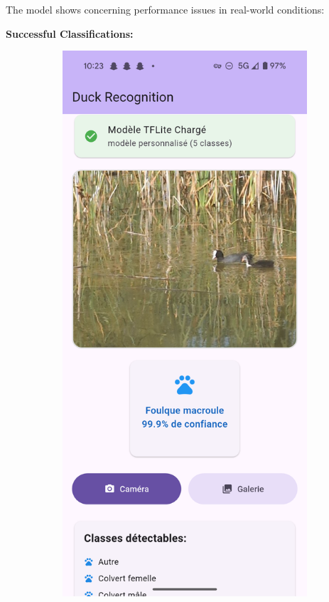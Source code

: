 \documentclass[12pt,a4paper]{article}
\begin{document}
The model shows concerning performance issues in real-world conditions:

\textbf{Successful Classifications:}

\begin{figure}[H]
    \centering
    \begin{subfigure}[b]{0.45\textwidth}
        \centering
        \includegraphics[width=\textwidth]{../../images/Results/Screenshot_20250615-102307.png}

\end{subfigure}
\end{figure}
\end{document}
